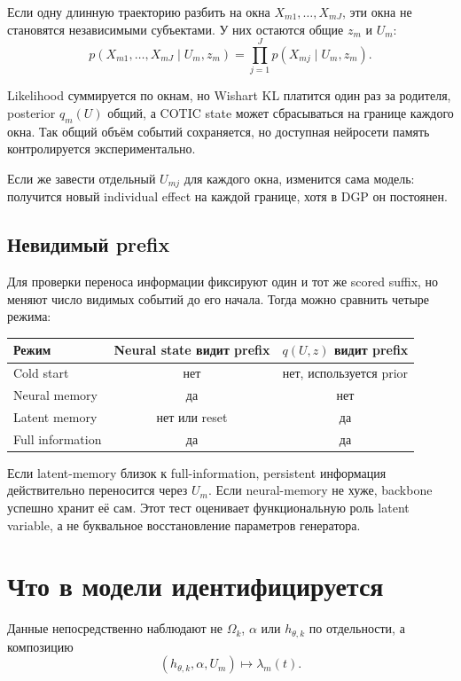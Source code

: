 \documentclass[12pt,a4paper]{article}
\begin{document}
Если одну длинную траекторию разбить на окна \(X_{m1},\ldots,X_{mJ}\), эти окна не становятся независимыми субъектами. У них остаются общие \(z_m\) и \(U_m\):
\begin{equation}
p(X_{m1},\ldots,X_{mJ}\mid U_m,z_m)=\prod_{j=1}^{J}p(X_{mj}\mid U_m,z_m).
\label{eq:grouped-likelihood}
\end{equation}

Likelihood суммируется по окнам, но Wishart KL платится один раз за родителя, posterior \(q_m(U)\) общий, а COTIC state может сбрасываться на границе каждого окна. Так общий объём событий сохраняется, но доступная нейросети память контролируется экспериментально.

Если же завести отдельный \(U_{mj}\) для каждого окна, изменится сама модель: получится новый individual effect на каждой границе, хотя в DGP он постоянен.

\subsection{Невидимый prefix}

Для проверки переноса информации фиксируют один и тот же scored suffix, но меняют число видимых событий до его начала. Тогда можно сравнить четыре режима:
\begin{center}
\begin{tabular}{@{}lcc@{}}
\toprule
Режим & Neural state видит prefix & \(q(U,z)\) видит prefix \\
\midrule
Cold start & нет & нет, используется prior \\
Neural memory & да & нет \\
Latent memory & нет или reset & да \\
Full information & да & да \\
\bottomrule
\end{tabular}
\end{center}

Если latent-memory близок к full-information, persistent информация действительно переносится через \(U_m\). Если neural-memory не хуже, backbone успешно хранит её сам. Этот тест оценивает функциональную роль latent variable, а не буквальное восстановление параметров генератора.

\section{Что в модели идентифицируется}

Данные непосредственно наблюдают не \(\Omega_k\), \(\alpha\) или \(h_{\theta,k}\) по отдельности, а композицию
\begin{equation}
(h_{\theta,k},\alpha,U_m)\longmapsto\lambda_m(t).
\end{equation}
\end{document}
